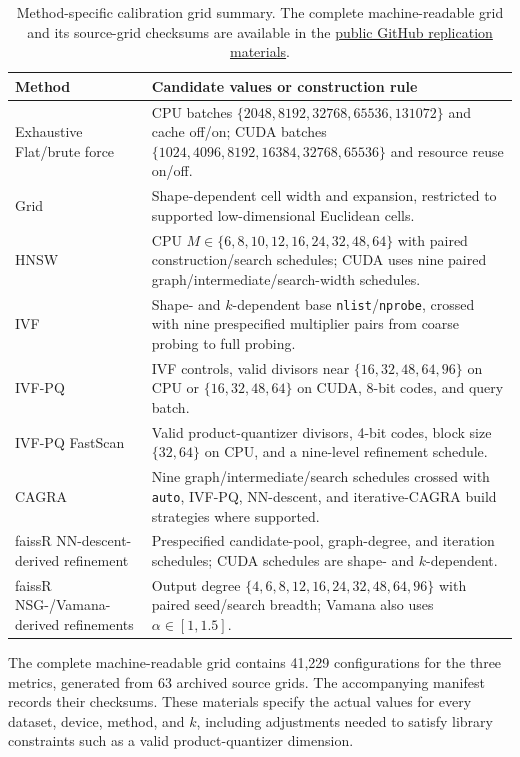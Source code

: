 \documentclass[11pt]{article}
\newcommand{\code}[1]{\texttt{#1}}
\begin{document}
\begin{table}[h]
\centering

\begin{tabularx}{\textwidth}{@{}lY@{}}
\toprule
Method & Candidate values or construction rule \\
\midrule
Exhaustive Flat/brute force & CPU batches $\{2048,8192,32768,65536,131072\}$ and cache off/on; CUDA batches $\{1024,4096,8192,16384,32768,65536\}$ and resource reuse on/off. \\
Grid & Shape-dependent cell width and expansion, restricted to supported low-dimensional Euclidean cells. \\
HNSW & CPU $M\in\{6,8,10,12,16,24,32,48,64\}$ with paired construction/search schedules; CUDA uses nine paired graph/intermediate/search-width schedules. \\
IVF & Shape- and $k$-dependent base \code{nlist}/\code{nprobe}, crossed with nine prespecified multiplier pairs from coarse probing to full probing. \\
IVF-PQ & IVF controls, valid divisors near $\{16,32,48,64,96\}$ on CPU or $\{16,32,48,64\}$ on CUDA, 8-bit codes, and query batch. \\
IVF-PQ FastScan & Valid product-quantizer divisors, 4-bit codes, block size $\{32,64\}$ on CPU, and a nine-level refinement schedule. \\
CAGRA & Nine graph/intermediate/search schedules crossed with \code{auto}, IVF-PQ, NN-descent, and iterative-CAGRA build strategies where supported. \\
faissR NN-descent-derived refinement & Prespecified candidate-pool, graph-degree, and iteration schedules; CUDA schedules are shape- and $k$-dependent. \\
faissR NSG-/Vamana-derived refinements & Output degree $\{4,6,8,12,16,24,32,48,64,96\}$ with paired seed/search breadth; Vamana also uses $\alpha\in[1,1.5]$. \\
\bottomrule
\end{tabularx}
\caption{Method-specific calibration grid summary. The complete
machine-readable grid and its source-grid checksums are available in the
\href{https://github.com/tkcaccia/faissR/tree/main/manuscript/jss}{public
GitHub replication materials}.}
\label{tab:grid}
\end{table}

The complete machine-readable grid contains 41,229 configurations for the
three metrics, generated from 63 archived source grids. The accompanying
manifest records their checksums. These materials specify the actual values
for every dataset, device, method, and $k$, including adjustments needed to
satisfy library constraints such as a valid product-quantizer dimension.
\end{document}

